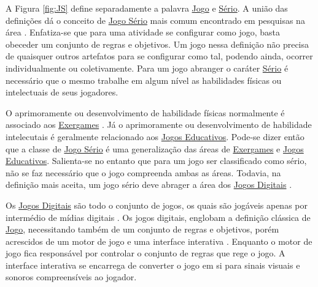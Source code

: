 \vspace{-0,4cm}

A Figura \ref{fig:JS} define separadamente a palavra \underline{Jo}g\underline{o} e \underline{Sério}. A união das definições dá o conceito de \underline{Jo}g\underline{o Sério} mais comum encontrado em pesquisas na área \cite{michael2005serious}. Enfatiza-se que para uma atividade se configurar como jogo, basta obeceder um conjunto de regras e objetivos. Um jogo nessa definição não precisa de quaisquer outros artefatos para se configurar como tal, podendo ainda, ocorrer individualmente ou coletivamente. Para um jogo abranger o caráter \underline{Sério} é necessário que o mesmo trabalhe em algum nível as habilidades físicas ou intelectuais de seus jogadores. 

\vspace{-0,1cm}

O aprimoramente ou desenvolvimento de habilidade físicas normalmente é associado aos \underline{Exer}g\underline{ames} \cite{araujo2017exergames, schroeder2017wobu}. Já o aprimoramente ou desenvolvimento de habilidade intelecutais é geralmente relacionado aos \underline{Jo}g\underline{os Educativos}. Pode-se dizer então que a classe de \underline{Jo}g\underline{o Sério} é uma generalização das áreas de \underline{Exer}g\underline{ames} e \underline{Jo}g\underline{os Educativos}. Salienta-se no entanto que para um jogo ser classificado como sério, não se faz necessário que o jogo compreenda ambas as áreas. Todavia, na definição mais aceita, um jogo sério deve abrager a área dos  \underline{Jo}g\underline{os Di}g\underline{itais} \cite{laamarti2014overview}.


\vspace{-0,1cm}

Os \underline{Jo}g\underline{os Di}g\underline{itais} são todo o conjunto de jogos, os quais são jogáveis apenas por intermédio de mídias digitais \cite{lucchese2009conceituaccao}. Os jogos digitais, englobam a definição clássica de \underline{Jo}g\underline{o}, necessitando também de um conjunto de regras e objetivos, porém acrescidos de um motor de jogo e uma interface interativa \cite{battaiola2000jogos}. Enquanto o motor de jogo fica responsável por controlar o conjunto de regras que rege o jogo. A interface interativa se encarrega de converter o jogo em si para sinais visuais e sonoros compreensíveis ao jogador.

